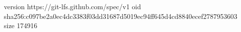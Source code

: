 version https://git-lfs.github.com/spec/v1
oid sha256:c097be2a0ec4dc3383f03dd31687d5019ec94ff645d4cd8840ecef2787953603
size 174916
